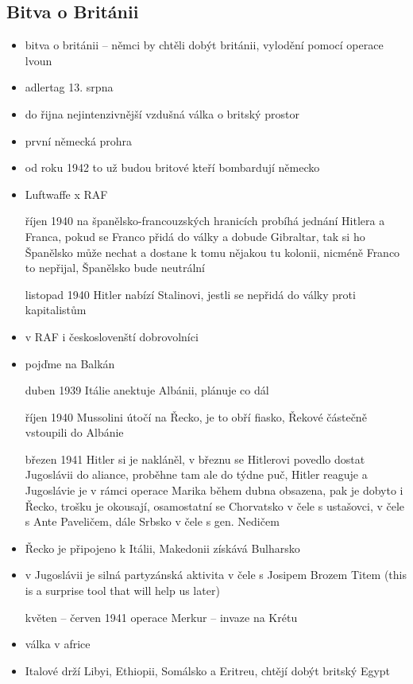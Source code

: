 \documentclass{article}
\begin{document}
\subsection*{Bitva o Británii}
\begin{itemize}
    \vspace{-0.5em}
    \setlength\itemsep{0.15em}
    \item bitva o británii -- němci by chtěli dobýt británii, vylodění pomocí operace lvoun
    \item adlertag 13. srpna
    \item do řijna nejintenzivnější vzdušná válka o britský prostor
    \item první německá prohra
    \item od roku 1942 to už budou britové kteří bombardují německo
    \item Luftwaffe x RAF
    \item[říjen 1940] na španělsko-francouzských hranicích probíhá jednání Hitlera a Franca, pokud se Franco přidá do války a dobude Gibraltar, tak si ho Španělsko může nechat a dostane k tomu nějakou tu kolonii, nicméně Franco to nepřijal, Španělsko bude neutrální
    \item[listopad 1940] Hitler nabízí Stalinovi, jestli se nepřidá do války proti kapitalistům
    \item v RAF i českoslovenští dobrovolníci
    \item pojďme na Balkán
    \item[duben 1939] Itálie anektuje Albánii, plánuje co dál
    \item[říjen 1940] Mussolini útočí na Řecko, je to obří fiasko, Řekové částečně vstoupili do Albánie
    \item[březen 1941] Hitler si je nakláněl, v březnu se Hitlerovi povedlo dostat Jugoslávii do aliance, proběhne tam ale do týdne puč, Hitler reaguje a Jugoslávie je v rámci operace Marika během dubna obsazena, pak je dobyto i Řecko, trošku je okousají, osamostatní se Chorvatsko v čele s ustašovci, v čele s Ante Paveličem, dále Srbsko v čele s gen. Nedičem
    \item Řecko je připojeno k Itálii, Makedonii získává Bulharsko
    \item v Jugoslávii je silná partyzánská aktivita v čele s Josipem Brozem Titem (this is a surprise tool that will help us later)
    \item[květen -- červen 1941] operace Merkur -- invaze na Krétu
    \item válka v africe
    \item Italové drží Libyi, Ethiopii, Somálsko a Eritreu, chtějí dobýt britský Egypt

\end{itemize}
\end{document}
